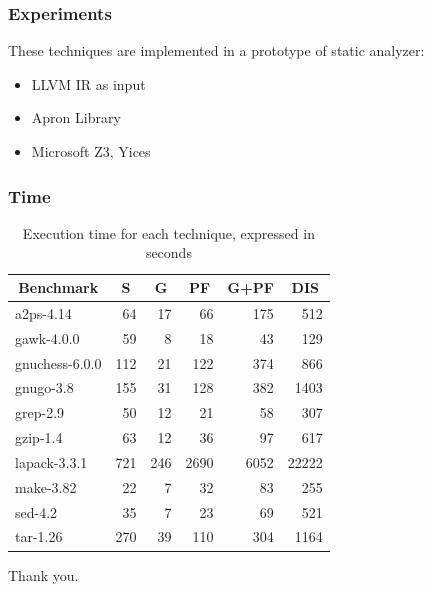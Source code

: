 \documentclass{beamer}
\begin{document}
\begin{frame}
	\frametitle{Experiments}
	These techniques are implemented in a prototype of static analyzer:
	\begin{itemize}
		\item LLVM IR as input
		\item Apron Library
		\item Microsoft Z3, Yices
	\end{itemize}
\end{frame}

\begin{frame}
\begin{figure}[h]
  \begin{center}
    
  \end{center} 
  \end{figure}
\end{frame}

\begin{frame}
	\frametitle{Time}
\begin{table}[!h]
	\centering
\begin{tabular}{|l|r|r|r|r|r|} \hline
	\multicolumn{1}{|c|}{Benchmark} &
		\multicolumn{1}{c|}{\textbf{S}} &
		\multicolumn{1}{c|}{\textbf{G}} &
		\multicolumn{1}{c|}{\textbf{PF}} &
		\multicolumn{1}{c|}{\textbf{G+PF}} &
	\multicolumn{1}{c|}{\textbf{DIS}} \\ \hline
a2ps-4.14 & 64 & 17 & 66 & 175 & 512 \\
gawk-4.0.0 & 59 & 8 & 18 & 43 & 129 \\
gnuchess-6.0.0 & 112 & 21 & 122 & 374 & 866 \\
gnugo-3.8 & 155 & 31 & 128 & 382 & 1403 \\
grep-2.9 & 50 & 12 & 21 & 58 & 307 \\
gzip-1.4 & 63 & 12 & 36 & 97 & 617 \\
lapack-3.3.1 & 721 & 246 & 2690 & 6052 & 22222 \\
make-3.82 & 22 & 7 & 32 & 83 & 255 \\
sed-4.2 & 35 & 7 & 23 & 69 & 521 \\
tar-1.26 & 270 & 39 & 110 & 304 & 1164 \\
	\hline
\end{tabular}
\caption{Execution time for each technique, expressed in seconds}
\label{tab:time}
\end{table}

\end{frame}

\begin{frame}
\begin{center}
Thank you.
\end{center}
\end{frame}
\end{document}
